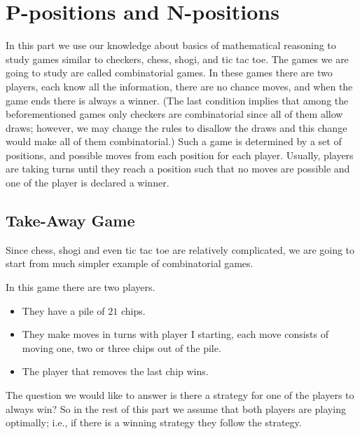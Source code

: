 \chapter{P-positions and N-positions}
\label{chapter:combinatorial-games}
In this part we use our knowledge about basics of mathematical reasoning
to study games similar to checkers, chess, shogi, and tic tac toe. The games we
are going to study are called combinatorial games. In these games there are two
players, each know all the information, there are no chance moves, and when the
game ends there is always a winner.
(The last condition implies that among the beforementioned games only checkers
are combinatorial since all of them allow draws; however, we may change the
rules to disallow the draws and this change would make all of them
combinatorial.) Such a game is determined by a set of positions, and possible
moves from each position for each player. Usually, players are taking turns
until they reach a position such that no moves are possible and one of the
player is declared a winner.

\section{Take-Away Game}

Since chess, shogi and even tic tac toe are relatively complicated,
we are going to start from much simpler example of combinatorial games.
\begin{game}
\label{game:take-away-21-3-2-1}
  In this game there are two players.
  \begin{itemize}
    \item They have a pile of $21$ chips.
    \item They make moves in turns with player I starting,
      each move consists of moving one, two or three chips out of the pile.
    \item The player that removes the last chip wins.
  \end{itemize}
\end{game}
The question we would like to answer is there a strategy for one of the players
to always win? So in the rest of this part we assume that both players are
playing optimally; i.e., if there is a winning strategy they follow the strategy.

